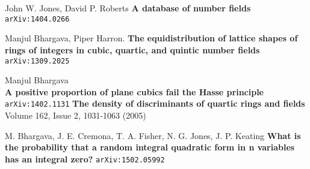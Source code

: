\documentclass[12pt]{article}
\begin{document}
\begin{thebibliography}{} 
\item John W. Jones, David P. Roberts \textbf{A database of number fields} \texttt{arXiv:1404.0266}
\item Manjul Bhargava, Piper Harron. \textbf{The equidistribution of lattice shapes of rings of integers in cubic, quartic, and quintic number fields} \texttt{ arXiv:1309.2025}
\item Manjul Bhargava \\
\textbf{A positive proportion of plane cubics fail the Hasse principle} \texttt{arXiv:1402.1131}
\textbf{The density of discriminants of quartic rings and fields} Volume 162, Issue 2, 1031-1063 (2005)
\item M. Bhargava, J. E. Cremona, T. A. Fisher, N. G. Jones, J. P. Keating \textbf{What is the probability that a random integral quadratic form in n variables has an integral zero?} \texttt{arXiv:1502.05992}
\end{thebibliography}  
\end{document}
